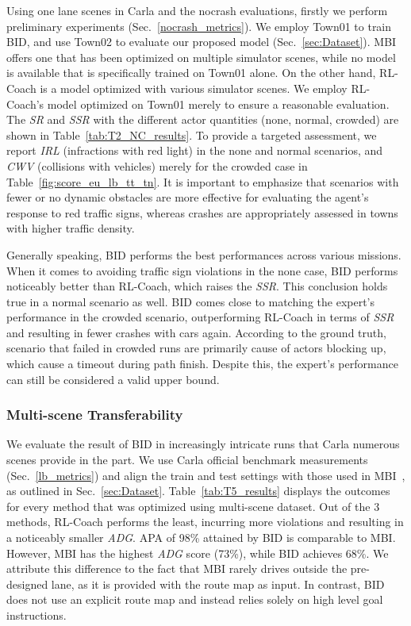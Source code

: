 \documentclass[preprint,12pt]{elsarticle}
\begin{document}
\hspace{1pc}Using one lane scenes in Carla and  the nocrash evaluations, firstly we perform preliminary experiments (Sec.~\ref{nocrash_metrics}). 
We employ Town01 to train BID, and use Town02 to evaluate our proposed model (Sec.~\ref{sec:Dataset}). 
MBI offers one that has been optimized on multiple simulator scenes, while no model is available that is specifically trained on Town01 alone. 
On the other hand, RL-Coach is a model optimized with various simulator scenes. 
We employ RL-Coach's model optimized on Town01 merely to ensure a reasonable evaluation. 
The \emph{SR} and \emph{SSR} with the different actor quantities (none, normal, crowded) are shown in Table~\ref{tab:T2_NC_results}. 
To provide a targeted assessment, we report \emph{IRL} (infractions with red light) in the none and normal scenarios, and \emph{CWV} (collisions with vehicles) merely for the crowded case in Table~\ref{fig:score_eu_lb_tt_tn}. 
It is important to emphasize that scenarios with fewer or no dynamic obstacles are more effective for evaluating the agent's response to red traffic signs, whereas crashes are appropriately assessed in towns with higher traffic density.


Generally speaking, BID performs the best performances across various missions. 
When it comes to avoiding traffic sign violations in the none case, BID performs noticeably better than RL-Coach, which raises the \emph{SSR}.
This conclusion holds true in a normal scenario as well. 
BID comes close to matching the expert's performance in the crowded scenario, outperforming RL-Coach in terms of \emph{SSR} and resulting in fewer crashes with cars again. 
According to the ground truth, scenario that failed in crowded runs are primarily cause of actors blocking up, which cause a timeout during path finish. 
Despite this, the expert's performance can still be considered a valid upper bound.


\subsubsection{Multi-scene Transferability}\label{sec:multi_towns_result}
\hspace{1pc}We evaluate the result of BID in increasingly intricate runs that Carla numerous scenes provide in the part. 
We use Carla official benchmark measurements (Sec.~\ref{lb_metrics}) and align the train and test settings with those used in MBI~\cite{Hu:2022}, as outlined in Sec.~\ref{sec:Dataset}. 
Table~\ref{tab:T5_results} displays the outcomes for every method that was optimized using multi-scene dataset. 
Out of the 3 methods, RL-Coach performs the least, incurring more violations and resulting in a noticeably smaller \emph{ADG}. 
APA of 98\% attained by BID is comparable to MBI. 
However, MBI has the highest \emph{ADG} score (73\%), while BID achieves 68\%. 
We attribute this difference to the fact that MBI rarely drives outside the pre-designed lane, as it is provided with the route map as input. 
In contrast, BID does not use an explicit route map and instead relies solely on high level  goal instructions.
\end{document}
